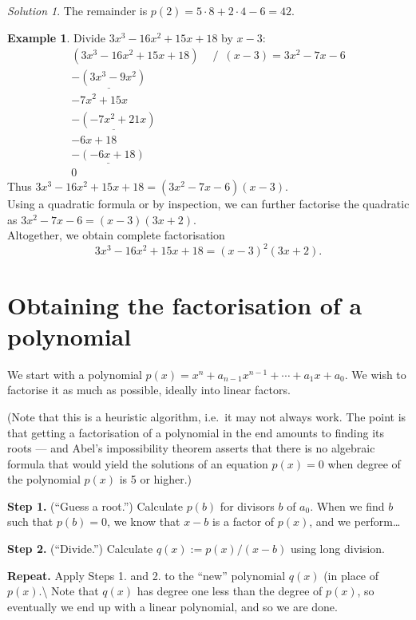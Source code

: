 \documentclass[
  english,
  12pt,
  oneside]{book}
\theoremstyle{definition}
\theoremstyle{definition}
\newtheorem{example}{Example}[chapter]
\theoremstyle{definition}
\theoremstyle{definition}
\theoremstyle{remark}
\newtheorem*{solution}{Solution}
\begin{document}
\begin{solution}
The remainder is \(p(2) = 5\cdot8+2\cdot4-6=42\).
\end{solution}

\begin{example}
Divide \(3x^3-16x^2+15x+18\) by \(x-3\):
\[\begin{array}{rl}
(3x^3-16x^2+15x+18) & / \,\,\,(x-3) = 3x^2-7x-6\\
\underline{-(3x^3-9x^2)}\phantom{+15x+18x}\\
-7x^2 + 15x\phantom{+18x)}\\
\underline{-(-7x^2+21x)}\phantom{+18o}\\
-6x+18\phantom{x}\\
\underline{-(-6x+18)}\\
0\phantom{x}
\end{array}\]
Thus \(3x^3-16x^2+15x+18 = (3x^2-7x-6)(x-3)\).\\
Using a quadratic formula or by inspection, we can further factorise the quadratic as \(3x^2-7x-6 = (x-3)(3x+2)\).\\
Altogether, we obtain complete factorisation
\[3x^3-16x^2+15x+18=(x-3)^2(3x+2).\]
\end{example}

\section{Obtaining the factorisation of a polynomial}\label{obtaining-the-factorisation-of-a-polynomial}

We start with a polynomial \(p(x)=x^n+a_{n-1}x^{n-1}+\cdots+a_1x+a_0\). We wish to factorise it as much as possible, ideally into linear factors.

(Note that this is a heuristic algorithm, i.e.~it may not always work. The
point is that getting a factorisation of a polynomial in the end amounts to
finding its roots --- and Abel's impossibility theorem asserts that there is no
algebraic formula that would yield the solutions of an equation \(p(x)=0\) when
degree of the polynomial \(p(x)\) is 5 or higher.)

\textbf{Step 1.} (``Guess a root.'') Calculate \(p(b)\) for divisors \(b\) of \(a_0\). When we find \(b\) such that \(p(b)=0\), we know that \(x-b\) is a factor of \(p(x)\), and we perform\dots

\textbf{Step 2.} (``Divide.'') Calculate \(q(x) := p(x) / (x-b)\) using long division.

\textbf{Repeat.} Apply Steps 1. and 2. to the ``new'' polynomial \(q(x)\) (in place of \(p(x)\).\textbackslash{}
Note that \(q(x)\) has degree one less than the degree of \(p(x)\), so eventually
we end up with a linear polynomial, and so we are done.
\end{document}
